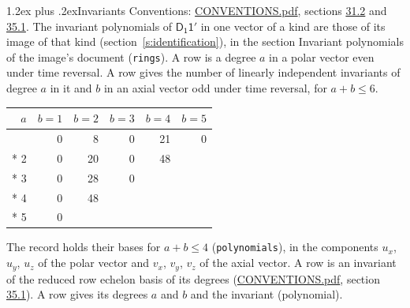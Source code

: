 \documentclass[10pt,a4paper]{article}
\makeatletter
\renewcommand\section{\@startsection{section}{1}{\z@}{-3ex plus -1ex minus -.2ex}%
  {1.2ex plus .2ex}{\normalfont\large\sffamily\bfseries\color{parttitle}}}
\numberwithin{equation}{section}
\newcommand{\grp}[1]{\mathsf{#1}}
\makeatother
\begin{document}
\section{Invariants}\label{s:invariants}
Conventions: \href{../../CONVENTIONS.pdf}{CONVENTIONS.pdf}, sections \href{../../CONVENTIONS.pdf\#conv.31.2}{31.2} and \href{../../CONVENTIONS.pdf\#conv.35.1}{35.1}.
The invariant polynomials of $\grp{D_{1}1'}$ in one vector of a kind are those of its image of that kind (section~\ref{s:identification}), in the section Invariant polynomials of the image's document (\texttt{rings}).
\leavevmode\label{n:index.degree.polar}\label{n:index.degree.axial}A row is a degree $a$ in a polar vector even under time reversal. A row gives the number of linearly independent invariants of degree $a$ in it and $b$ in an axial vector odd under time reversal, for $a + b \le 6$.
{\small\begin{longtable}{@{}rrrrrr@{}}\toprule
$a$ & $b = 1$ & $b = 2$ & $b = 3$ & $b = 4$ & $b = 5$\\\midrule\endhead
\bottomrule\endfoot\endlastfoot
1 & 0 & 8 & 0 & 21 & 0\\*
2 & 0 & 20 & 0 & 48 & \\*
3 & 0 & 28 & 0 &  & \\*
4 & 0 & 48 &  &  & \\*
5 & 0 &  &  &  & \\
\bottomrule\end{longtable}}
\leavevmode\label{n:local.component.polar}\label{n:local.component.axial}The record holds their bases for $a + b \le 4$ (\texttt{polynomials}), in the components $u_{x}$, $u_{y}$, $u_{z}$ of the polar vector and $v_{x}$, $v_{y}$, $v_{z}$ of the axial vector. \label{n:head.polynomial}A row is an invariant of the reduced row echelon basis of its degrees (\href{../../CONVENTIONS.pdf}{CONVENTIONS.pdf}, section \href{../../CONVENTIONS.pdf\#conv.35.1}{35.1}). A row gives its degrees $a$ and $b$ and the invariant (polynomial).
\end{document}
